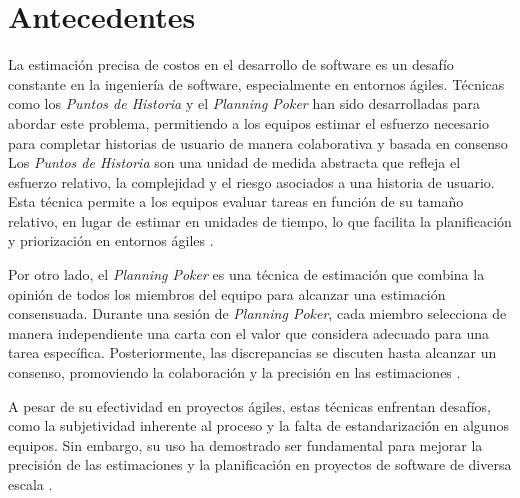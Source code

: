 \nochapterlabel
\chapter{Antecedentes}
La estimación precisa de costos en el desarrollo de software es un desafío constante en la ingeniería de software, especialmente en entornos ágiles. Técnicas como los \textit{Puntos de Historia} y el \textit{Planning Poker} han sido desarrolladas para abordar este problema, permitiendo a los equipos estimar el esfuerzo necesario para completar historias de usuario de manera colaborativa 
y basada en consenso \parencite{asana_planning_poker}
Los \textit{Puntos de Historia} son una unidad de medida abstracta que refleja el esfuerzo relativo, la complejidad y el riesgo asociados a una historia de usuario. Esta técnica permite a los equipos evaluar tareas en función de su tamaño relativo, en lugar de estimar en unidades de tiempo, lo que facilita 
la planificación y priorización en entornos ágiles \parencite{asana_story_points}.

Por otro lado, el \textit{Planning Poker} es una técnica de estimación que combina la opinión de todos los miembros del equipo para alcanzar una estimación consensuada. Durante una sesión de \textit{Planning Poker}, cada miembro selecciona de manera independiente una carta con el valor que considera adecuado para una tarea específica. Posteriormente, las discrepancias se discuten hasta alcanzar un consenso, promoviendo 
la colaboración y la precisión en las estimaciones \parencite{asana_planning_poker}.

A pesar de su efectividad en proyectos ágiles, estas técnicas enfrentan desafíos, como la subjetividad inherente al proceso y la falta de estandarización en algunos equipos. Sin embargo, su uso ha demostrado ser fundamental para mejorar la precisión de las estimaciones y la planificación 
en proyectos de software de diversa escala \parencite{asana_planning_poker}.
